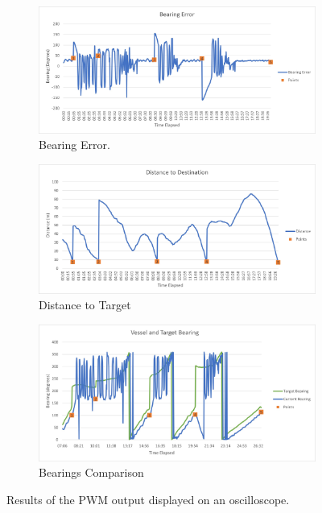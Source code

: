 \begin{figure}
	\begin{center}
		\begin{subfigure}{0.8\linewidth}
			\includegraphics[width = \linewidth]{figures/graphBearingError.jpg}
			\caption{Bearing Error.}
			\label{grph:4:BearingError}	
		\end{subfigure}
		\begin{subfigure}{0.8\linewidth}
			\includegraphics[width = \linewidth]{figures/graphDistance.jpg}
			\caption{Distance to Target}
			\label{grph:4:distance}	
		\end{subfigure}
		\begin{subfigure}{0.8\linewidth}
			\includegraphics[width = \linewidth]{figures/graphBearings.jpg}
			\caption{Bearings Comparison}
			\label{grph:4:2bearings}	
		\end{subfigure}
		\caption{Results of the PWM output displayed on an oscilloscope.}
		\label{fig:4:Results}
	\end{center}
\end{figure} 
